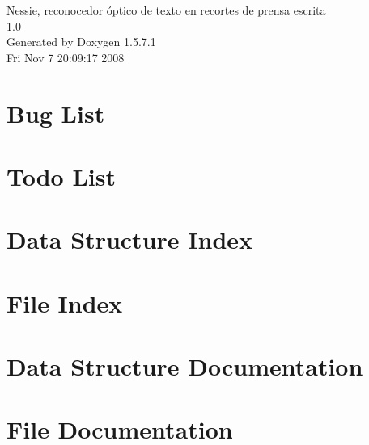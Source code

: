 \documentclass[a4paper]{article}
\begin{document}
\begin{titlepage}
\vspace*{7cm}
\begin{center}
{\Large Nessie, reconocedor óptico de texto en recortes de prensa escrita \\[1ex]\large 1.0 }\\
\vspace*{1cm}
{\large Generated by Doxygen 1.5.7.1}\\
\vspace*{0.5cm}
{\small Fri Nov 7 20:09:17 2008}\\
\end{center}
\end{titlepage}
\tableofcontents
{}
\section{Bug List}
\label{bug}
\hypertarget{bug}{}

\section{Todo List}
\label{todo}
\hypertarget{todo}{}

\section{Data Structure Index}

\section{File Index}

\section{Data Structure Documentation}










\section{File Documentation}





















\printindex
\end{document}
